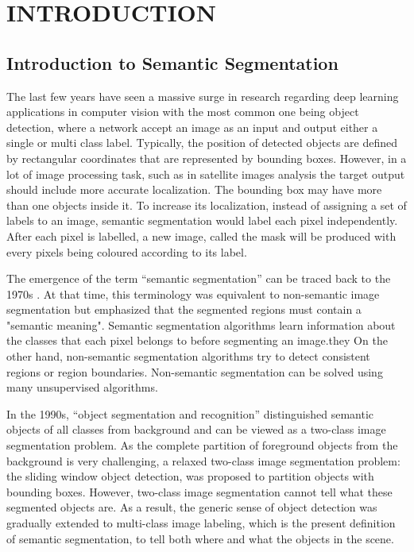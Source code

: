 \chapter{INTRODUCTION}
\section{Introduction to Semantic Segmentation}

The last few years have seen a massive surge in research regarding deep learning applications in computer vision with the most common one being object detection, where a network accept an image as an input and output either a single or multi class label. Typically, the position of detected objects are defined by rectangular coordinates that are represented by bounding boxes. However, in a lot of image processing task, such as in satellite images analysis the target output should include more accurate localization. The bounding box may have more than one objects inside it. To increase its localization, instead of assigning a set of labels to an image, semantic segmentation would label each pixel independently. After each pixel is labelled, a new image, called the mask  will be produced with every pixels being coloured according to its label.

The emergence of the term “semantic segmentation” can be traced back to the 1970s \cite{YU201882}. At that time, this terminology was equivalent to non-semantic image segmentation but emphasized that the segmented regions must contain a "semantic meaning". Semantic segmentation algorithms learn information about the classes that each pixel belongs to before segmenting an image.they On the other hand, non-semantic segmentation algorithms try to detect consistent regions or region boundaries. Non-semantic segmentation can be solved using many unsupervised algorithms. 

In the 1990s, “object segmentation and recognition”  distinguished semantic objects of all classes from background and can be viewed as a two-class image segmentation problem. As the complete partition of foreground objects from the background is very challenging, a relaxed two-class image segmentation problem: the sliding window object detection, was proposed to partition objects with bounding boxes. However, two-class image segmentation cannot tell what these segmented objects are. As a result, the generic sense of object detection was gradually extended to multi-class image labeling, which is the present definition of semantic segmentation, to tell both where and what the objects in the scene.

